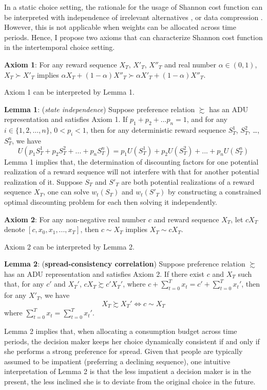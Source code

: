 \documentclass[
  12pt,
]{article}
\begin{document}
In a static choice setting, the rationale for the usage of Shannon cost
function can be interpreted with independence of irrelevant alternatives
\citep{matejka_rational_2015}, or data compression
\citep{caplin_rationally_2022}. However, this is not applicable when
weights can be allocated across time periods. Hence, I propose two
axioms that can characterize Shannon cost function in the intertemporal
choice setting.

\textbf{Axiom 1}: For any reward sequence \(X_T\), \(X'_T\), \(X''_T\)
and real number \(\alpha\in(0,1)\), \(X_T\succ X'_T\) implies
\(\alpha X_T+ (1-\alpha)X''_T \succ \alpha X'_T + (1-\alpha) X''_T\).

Axiom 1 can be interpreted by Lemma 1.

\textbf{Lemma 1}: (\emph{state independence}) Suppose preference
relation \(\succsim\) has an ADU representation and satisfies Axiom 1.
If \(p_1+p_2+...p_n=1\), and for any \(i\in\{1,2,…,n\}\), \(0<p_i<1\),
then for any deterministic reward sequence \(S^1_T\), \(S^2_T\), \ldots,
\(S^n_T\), we have\[
U(p_1 S^1_T+p_2S^2_T+...+p_nS^n_T)=p_1U(S^1_T)+p_2U(S^2_T)+...+p_nU(S^n_T)
\]Lemma 1 implies that, the determination of discounting factors for one
potential realization of a reward sequence will not interfere with that
for another potential realization of it. Suppose \(S_T\) and \(S'_{T}\)
are both potential realizations of a reward sequence \(X_T\), one can
solve \(w_t(S_T)\) and \(w_t(S'_T)\) by constructing a constrained
optimal discounting problem for each then solving it independently.

\textbf{Axiom 2}: For any non-negative real number \(c\) and reward
sequence \(X_T\), let \(cX_T\) denote \([c,x_0,x_1,...,x_T]\), then
\(c\sim X_T\) implies \(X_T \sim cX_T\).

Axiom 2 can be interpreted by Lemma 2.

\textbf{Lemma 2}: (\textbf{spread-consistency correlation}) Suppose
preference relation \(\succsim\) has an ADU representation and satisfies
Axiom 2. If there exist \(c\) and \(X_T\) such that, for any \(c'\) and
\(X_T'\), \(cX_T\succsim c'X_T'\), where
\(c+\sum_{t=0}^Tx_t=c'+\sum_{t=0}^Tx_t'\), then for any \(X'_T\), we
have \[X_T \succsim X_T' \Longleftrightarrow c\sim X_T\]where
\(\sum_{t=0}^Tx_t=\sum_{t=0}^Tx_t'\).

Lemma 2 implies that, when allocating a consumption budget across time
periods, the decision maker keeps her choice dynamically consistent if
and only if she performs a strong preference for spread. Given that
people are typically assumed to be impatient (preferring a declining
sequence), one intuitive interpretation of Lemma 2 is that the less
impatient a decision maker is in the present, the less inclined she is
to deviate from the original choice in the future.
\end{document}
